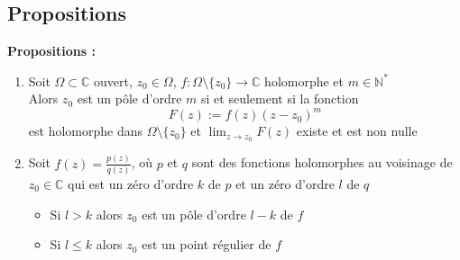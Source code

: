 \subsection{Propositions}
\textbf{Propositions :}
\begin{enumerate}
    \item Soit $\Omega \subset \mathbb{C}$ ouvert, $z_0 \in \Omega$, $f : \Omega \setminus \{z_0\} \to \mathbb{C}$ holomorphe et $m \in \mathbb{N}^*$\\
        Alors $z_0$ est un pôle d'ordre $m$ si et seulement si la fonction
    $$F(z) := f(z)(z-z_0)^m$$
    est holomorphe dans $\Omega \setminus \{z_0\}$ et $\lim_{z \to z_0}F(z)$ existe et est non nulle
    \item Soit $f(z) = \frac{p(z)}{q(z)}$, où $p$ et $q$ sont des fonctions holomorphes au voisinage de $z_0 \in \mathbb{C}$ qui est un zéro d’ordre $k$ de $p$ et un zéro d’ordre $l$ de $q$
    \begin{itemize}
        \item Si $l > k$ alors $z_0$ est un pôle d'ordre $l-k$ de $f$
        \item Si $l \leq k$ alors $z_0$ est un point régulier de $f$
    \end{itemize}
\end{enumerate}